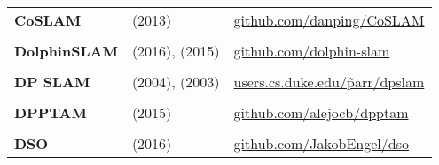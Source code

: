 \documentclass[a4paper,12pt]{scrartcl}
\begin{document}
{\begin{longtable}{l|l|l}
    \textbf{CoSLAM}        & \cite{Zou2013} (2013)                                                                       & {\href{https://github.com/danping/CoSLAM}{github.com/danping/CoSLAM}}                                                        \\
                           &                                                                                             &                                                                                                                              \\ [-3mm]
    \textbf{DolphinSLAM}   & \cite{Zaffari2016} (2016), \cite{Silveira2015} (2015)                                       & {\href{https://github.com/dolphin-slam}{github.com/dolphin-slam}}                                                            \\
                           &                                                                                             &                                                                                                                              \\ [-3mm]
    \textbf{DP SLAM}       & \cite{Eliazar2004} (2004), \cite{Eliazar2003} (2003)                                        & {\href{https://users.cs.duke.edu/~parr/dpslam}{users.cs.duke.edu/\~parr/dpslam}}                                             \\
                           &                                                                                             &                                                                                                                              \\ [-3mm]
    \textbf{DPPTAM}        & \cite{Concha2015b} (2015)                                                                   & {\href{https://github.com/alejocb/dpptam}{github.com/alejocb/dpptam}}                                                        \\
                           &                                                                                             &                                                                                                                              \\ [-3mm]
    \textbf{DSO}           & \cite{Engel2016} (2016)                                                                     & {\href{https://github.com/JakobEngel/dso}{github.com/JakobEngel/dso}}                                                        \\

\end{longtable}}
\end{document}
